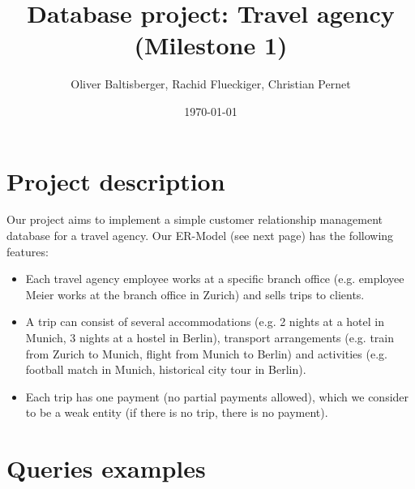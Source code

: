 \documentclass{article}
\title{Database project: Travel agency \\ (Milestone 1)}
\author{Oliver Baltisberger, Rachid Flueckiger, Christian Pernet}
\date{\today}
\begin{document}
	\maketitle
	
	\section*{Project description}
	Our project aims to implement a simple customer relationship management database
	for a travel agency. Our ER-Model (see next page) has the following features:
	\begin{itemize}
		\item Each travel agency employee works at a specific branch office (e.g. employee Meier works at the branch office in Zurich) and sells trips to clients.
 		\item A trip can consist of several accommodations (e.g. 2 nights at a hotel in Munich, 3 nights at a hostel in Berlin), transport arrangements (e.g. train from Zurich to Munich, flight from Munich to Berlin) and activities (e.g. football match in Munich, historical city tour in Berlin).
		\item Each trip has one payment (no partial payments allowed), which we consider to be a weak entity (if there is no trip, there is no payment).
	\end{itemize}
	
	\section*{Queries examples}
			
\end{document}
